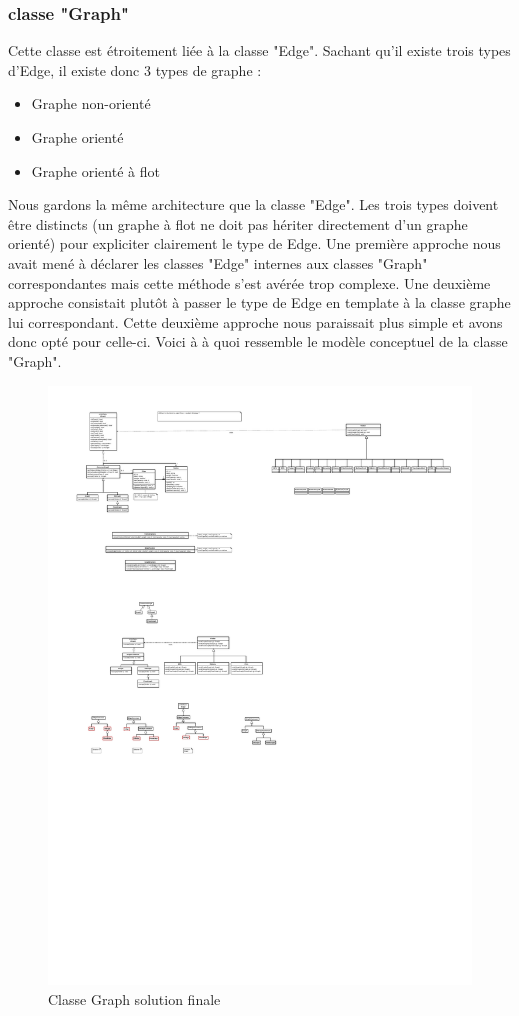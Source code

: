 \documentclass[french]{article}
\begin{document}
			\subsubsection{classe "Graph"}
			Cette classe est étroitement liée à la classe "Edge". Sachant qu'il existe trois types d'Edge, il existe donc 3 types de graphe :
			\begin{itemize}
				\item Graphe non-orienté
				\item Graphe orienté
				\item Graphe orienté à flot
			\end{itemize}
			Nous gardons la même architecture que la classe "Edge". Les trois types doivent être distincts (un graphe à flot ne doit pas hériter directement d'un graphe orienté) pour expliciter clairement le type de Edge.
			Une première approche nous avait mené à déclarer les classes "Edge" internes aux classes "Graph" correspondantes mais cette méthode s'est avérée trop complexe. Une deuxième approche consistait plutôt à passer le type de Edge en template à la classe graphe lui correspondant. Cette deuxième approche nous paraissait plus simple et avons donc opté pour celle-ci.
			Voici à à quoi ressemble le modèle conceptuel de la classe "Graph".
			\begin{figure}[H]
				\centering
				\includegraphics[scale=4.0]{Conception/graph/classgraphsol1.pdf}
				\caption{Classe Graph solution finale}
			\end{figure}
\end{document}

